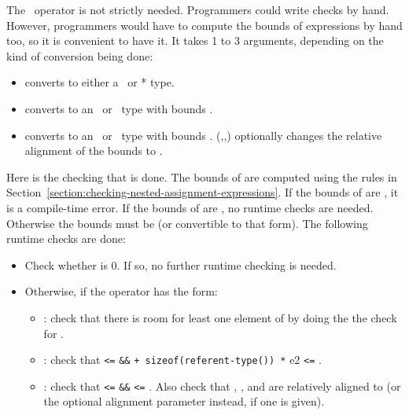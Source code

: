 The \dynamicboundscast\ operator is not strictly needed.
Programmers could write checks by hand.  However, programmers
would have to compute the bounds of expressions by hand too, so it is convenient to
have it. It takes 1 to 3 arguments, depending on the kind of conversion being done:
\begin{itemize}
\item
  converts  to either a \ptr\ or * type.
\item
   converts  to an \arrayptr\ or
  \arrayview\ type with bounds .  
\item
   converts  to an
  \arrayptr\ or \arrayview\ type with bounds
  .  
  {(,,)}
   optionally changes the relative alignment of the bounds to .
\end{itemize}

Here is the checking that is done. The bounds of  are computed
using the rules in Section~\ref{section:checking-nested-assignment-expressions}.
If the bounds of  are \boundsnone, it is a compile-time error. 
If the bounds of  are \boundsany, no runtime checks are needed.
Otherwise the bounds must be  (or convertible to that form).
The following runtime checks are done:
\begin{itemize}
\item Check whether  is 0.  If so, no further runtime checking
is needed.
\item Otherwise, if the operator has the form:
\begin{itemize}
\item
  :
  check that there is room for least one element of  by doing the
  the check for .
\item
  :
   check that 
  \texttt{<=}  \texttt{\&\&}  \texttt{+
  sizeof(referent-type(}\texttt{)) *} e2 \texttt{<=}
  .
\item
  : 
  check that  \texttt{<=}  \texttt{\&\&}
   \texttt{<=} . Also check that , , and  
  are relatively aligned to  (or the optional alignment parameter instead, if one
  is given). 

\end{itemize}
\end{itemize}

